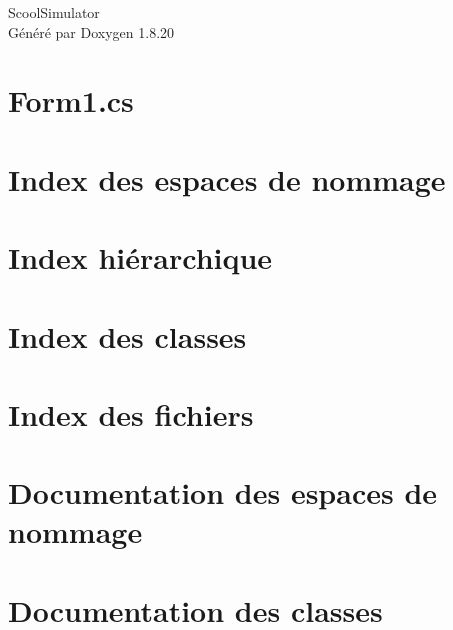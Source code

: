 \let\mypdfximage\pdfximage\def\pdfximage{\immediate\mypdfximage}\documentclass[twoside]{book}
\newcommand{\+}{\discretionary{\mbox{\scriptsize$\hookleftarrow$}}{}{}}
\newcommand{\clearemptydoublepage}{%
  \newpage{\pagestyle{empty}\cleardoublepage}%
}
\begin{document}
\hypersetup{pageanchor=false,
             bookmarksnumbered=true,
             pdfencoding=unicode
            }
\begin{titlepage}
\vspace*{7cm}
\begin{center}%
{\Large Scool\+Simulator }\\
\vspace*{1cm}
{\large Généré par Doxygen 1.8.20}\\
\end{center}
\end{titlepage}
\clearemptydoublepage
{}
\tableofcontents
\clearemptydoublepage
{}
\hypersetup{pageanchor=true}

\chapter{Form1.\+cs}
\label{index}\hypertarget{index}{}
\chapter{Index des espaces de nommage}

\chapter{Index hiérarchique}

\chapter{Index des classes}

\chapter{Index des fichiers}

\chapter{Documentation des espaces de nommage}



\chapter{Documentation des classes}















\end{document}
